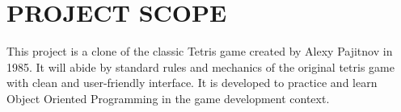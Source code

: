 
\section{PROJECT SCOPE}
\hspace{5mm}This project is a clone of the classic Tetris game created by Alexy Pajitnov in 1985. It will abide by standard rules and mechanics of the original tetris game with clean and user-friendly interface. It is developed to practice and learn Object Oriented Programming in the game development context.
